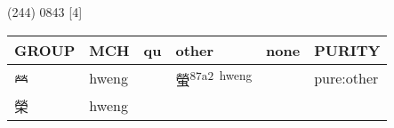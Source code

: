 \documentclass[14pt,a4paper]{scrartcl}
\begin{document}
(244) 0843 {[}4{]}

\begin{longtable}[c]{@{}llllll@{}}
\toprule
\begin{minipage}[b]{0.14\columnwidth}\raggedright\strut
GROUP
\strut\end{minipage} &
\begin{minipage}[b]{0.14\columnwidth}\raggedright\strut
MCH
\strut\end{minipage} &
\begin{minipage}[b]{0.14\columnwidth}\raggedright\strut
qu
\strut\end{minipage} &
\begin{minipage}[b]{0.14\columnwidth}\raggedright\strut
other
\strut\end{minipage} &
\begin{minipage}[b]{0.14\columnwidth}\raggedright\strut
none
\strut\end{minipage} &
\begin{minipage}[b]{0.14\columnwidth}\raggedright\strut
PURITY
\strut\end{minipage}\tabularnewline
\midrule
\endhead
\begin{minipage}[t]{0.14\columnwidth}\raggedright\strut
𤇾
\strut\end{minipage} &
\begin{minipage}[t]{0.14\columnwidth}\raggedright\strut
hweng
\strut\end{minipage} &
\begin{minipage}[t]{0.14\columnwidth}\raggedright\strut
\strut\end{minipage} &
\begin{minipage}[t]{0.14\columnwidth}\raggedright\strut
螢\textsuperscript{87a2~hweng}
\strut\end{minipage} &
\begin{minipage}[t]{0.14\columnwidth}\raggedright\strut
\strut\end{minipage} &
\begin{minipage}[t]{0.14\columnwidth}\raggedright\strut
pure:other
\strut\end{minipage}\tabularnewline
\begin{minipage}[t]{0.14\columnwidth}\raggedright\strut
榮
\strut\end{minipage} &
\begin{minipage}[t]{0.14\columnwidth}\raggedright\strut
hweng
\strut\end{minipage} &
\begin{minipage}[t]{0.14\columnwidth}\raggedright\strut

\end{minipage}
\end{longtable}
\end{document}
